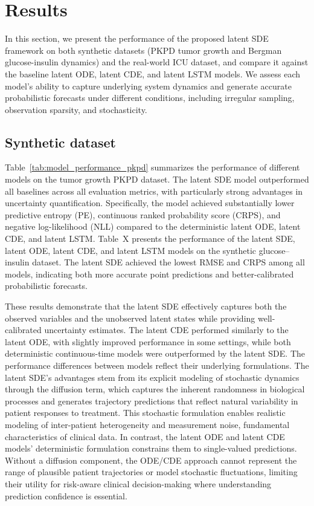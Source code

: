 \documentclass[preprint,12pt]{elsarticle}
\begin{document}
\section{Results}
In this section, we present the performance of the proposed latent SDE framework on both synthetic datasets (PKPD tumor growth and Bergman glucose-insulin dynamics) and the real-world ICU dataset, and compare it against the baseline latent ODE, latent CDE, and latent LSTM models. We assess each model's ability to capture underlying system dynamics and generate accurate probabilistic forecasts under different conditions, including irregular sampling, observation sparsity, and stochasticity.

\subsection{Synthetic dataset}

Table~\ref{tab:model_performance_pkpd} summarizes the performance of different models on the tumor growth PKPD dataset. The latent SDE model outperformed all baselines across all evaluation metrics, with particularly strong advantages in uncertainty quantification. Specifically, the model achieved substantially lower predictive entropy (PE), continuous ranked probability score (CRPS), and negative log-likelihood (NLL) compared to the deterministic latent ODE, latent CDE, and latent LSTM. Table~X presents the performance of the latent SDE, latent ODE, latent CDE, and latent LSTM models on the synthetic glucose–insulin dataset. The latent SDE achieved the lowest RMSE and CRPS among all models, indicating both more accurate point predictions and better-calibrated probabilistic forecasts. 

These results demonstrate that the latent SDE effectively captures both the observed variables and the unobserved latent states while providing well-calibrated uncertainty estimates. The latent CDE performed similarly to the latent ODE, with slightly improved performance in some settings, while both deterministic continuous-time models were outperformed by the latent SDE. The performance differences between models reflect their underlying formulations. The latent SDE's advantages stem from its explicit modeling of stochastic dynamics through the diffusion term, which captures the inherent randomness in biological processes and generates trajectory predictions that reflect natural variability in patient responses to treatment. This stochastic formulation enables realistic modeling of inter-patient heterogeneity and measurement noise, fundamental characteristics of clinical data. In contrast, the latent ODE and latent CDE models' deterministic formulation constrains them to single-valued predictions. Without a diffusion component, the ODE/CDE approach cannot represent the range of plausible patient trajectories or model stochastic fluctuations, limiting their utility for risk-aware clinical decision-making where understanding prediction confidence is essential.
\end{document}
